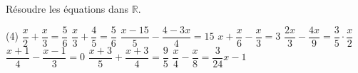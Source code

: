 \documentclass[a4paper,12pt]{report}
\begin{document}
\begin{acti}
Résoudre les équations dans $\mathbb{R}$.
	\begin{tasks}(4)
\task $\dfrac{x}{2}+\dfrac{x}{3}=\dfrac{5}{6}$
\task $\dfrac{x}{3}+\dfrac{4}{5}=\dfrac{5}{6}$
\task $\dfrac{x-15}{5}-\dfrac{4-3 x}{4}=15$
\task $x+\dfrac{x}{6}-\dfrac{x}{3}=3$
\task $\dfrac{2 x}{3}-\dfrac{4 x}{9}=\dfrac{3}{5} \cdot \dfrac{x}{2}$
\task $\dfrac{x+1}{4}-\dfrac{x-1}{3}=0$
\task $\dfrac{x+3}{5}+\dfrac{x+3}{4}=\dfrac{9}{5}$
\task $\dfrac{x}{4}-\dfrac{x}{8}=\dfrac{3}{24} x-1$
	\end{tasks}
\end{acti}

\end{document}
